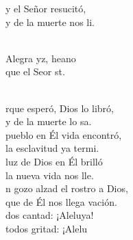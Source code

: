 \begin{cancion}%
	y el Señor resucitó,\\
	y de la muerte nos li. \\\jump\\
	\begin{chorus}%
	Alegra yz, heano\\
	que el Seor st.\\
	\end{chorus}%
	\jump\\
	rque esperó, Dios lo libró,\\
	y de la muerte lo sa.\\
\jump
	 pueblo en Él vida encontró,\\
	la esclavitud ya termi.\\
\jump
	 luz de Dios en Él brilló\\
	la nueva vida nos lle.\\
\jump
	n gozo alzad el rostro a Dios,\\
	que de Él nos llega vación.\\
\jump
	dos cantad: ¡Aleluya!\\
	todos gritad: ¡Alelu\\
\end{cancion}%
